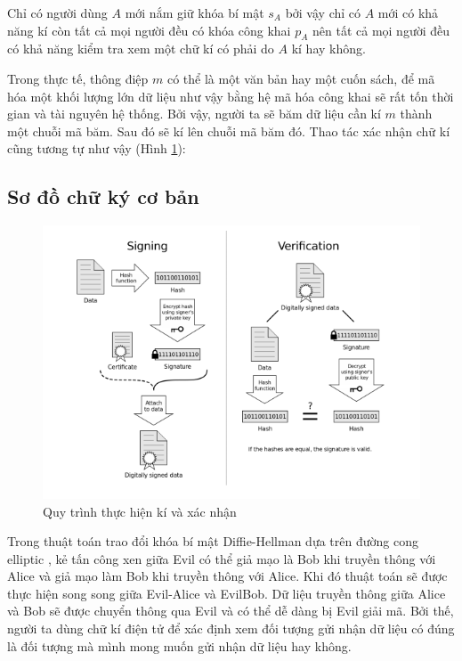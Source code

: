 \documentclass[a4paper,12pt]{report}
\begin{document}
Chỉ có người dùng $A$ mới nắm giữ khóa bí mật $s_A$ bởi vậy chỉ có $A$ mới có khả năng kí còn tất cả mọi người đều có khóa công khai $p_A$ nên tất cả mọi người đều có khả năng kiểm tra xem một chữ kí có phải do $A$ kí hay không.

Trong thực tế, thông điệp $m$ có thể là một văn bản hay một cuốn sách, để mã hóa một khối lượng lớn dữ liệu như vậy bằng hệ mã hóa công khai sẽ rất tốn thời gian và tài nguyên hệ thống. Bởi vậy, người ta sẽ băm dữ liệu cần kí $m$ thành một chuỗi mã băm. Sau đó sẽ kí lên chuỗi mã băm đó. Thao tác xác nhận chữ kí cũng tương tự như vậy (Hình \ref{sign1}):
\subsection*{Sơ đồ chữ ký cơ bản}
\begin{center}
\begin{figure}[H] 
\centering
\includegraphics[width=0.8\linewidth]{../im20.png}
\caption{Quy trình thực hiện kí và xác nhận} \label{sign1}
\end{figure}
\end{center}

Trong thuật toán trao đổi khóa bí mật Diffie-Hellman  dựa trên đường cong elliptic , kẻ tấn công xen giữa Evil có thể giả mạo là Bob khi truyền thông với Alice và giả mạo làm Bob khi truyền thông với Alice. Khi đó thuật toán sẽ được thực hiện song song giữa Evil-Alice và EvilBob. Dữ liệu truyền thông giữa Alice và Bob sẽ được chuyển thông qua Evil và có thể dễ dàng bị Evil giải mã. Bởi thế, người ta dùng chữ kí điện tử để xác định xem đối tượng gửi nhận dữ liệu có đúng là đối tượng mà mình mong muốn gửi nhận dữ liệu hay không.
\end{document}
